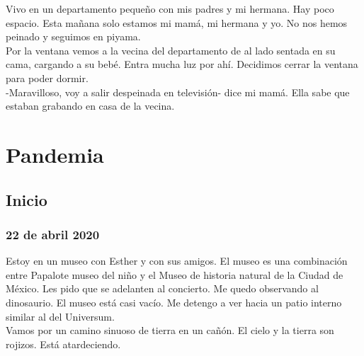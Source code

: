 \documentclass[12pt]{book}
\begin{document}
Vivo en un departamento pequeño con mis padres y mi hermana. Hay poco espacio. Esta mañana solo estamos mi mamá, mi hermana y yo. No nos hemos peinado y seguimos en piyama. 
\\
Por la ventana vemos a la vecina del departamento de al lado sentada en su cama, cargando a su bebé. Entra mucha luz por ahí. Decidimos cerrar la ventana para poder dormir.
\\
-Maravilloso, voy a salir despeinada en televisión- dice mi mamá. Ella sabe que estaban grabando en casa de la vecina.


\chapter{Pandemia}

\section{Inicio}

\subsection*{\hfill 22 de abril 2020}

Estoy en un museo con Esther y con sus amigos. El museo es una combinación entre Papalote museo del niño y el Museo de historia natural de la Ciudad de México. Les pido que se adelanten al concierto. Me quedo observando al dinosaurio. El museo está casi vacío. Me detengo a ver hacia un patio interno similar al del Universum.\\
Vamos por un camino sinuoso de tierra en un cañón. El cielo y la tierra son rojizos. Está atardeciendo.
\end{document}
